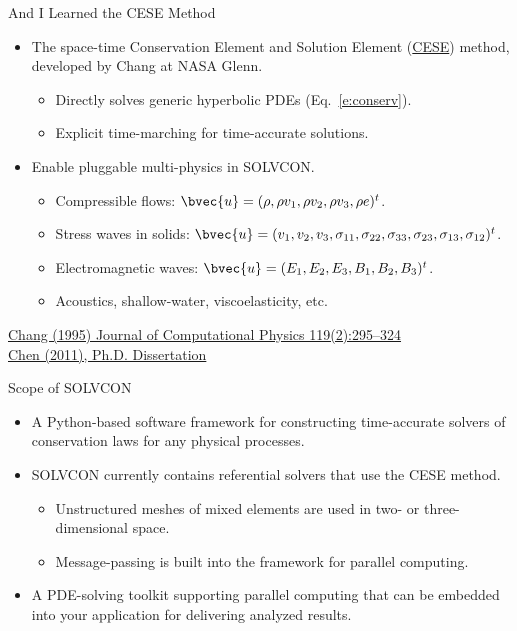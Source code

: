 \documentclass[dvips,xcolor=pst,14pt]{beamer}
\begin{document}
\begin{frame}{
%
And I Learned the CESE Method
%
}
\begin{itemize}
  \item The space-time Conservation Element and Solution Element
  (\href{http://www.grc.nasa.gov/WWW/microbus/}{CESE}) method, developed by
  Chang at NASA Glenn.
  \begin{itemize}
    \item Directly solves generic hyperbolic PDEs (Eq.~\eqref{e:conserv}).
    \item Explicit time-marching for time-accurate solutions.
  \end{itemize}
  \item Enable pluggable multi-physics in SOLVCON.
  \begin{itemize}
    \item Compressible flows: $\bvec{u} = (\rho, \rho v_1, \rho v_2, \rho v_3,
    \rho e)^t$.
    \item Stress waves in solids: $\bvec{u} = (v_1, v_2, v_3, \sigma_{11},
    \sigma_{22}, \sigma_{33}, \sigma_{23}, \sigma_{13}, \sigma_{12})^t$.
    \item Electromagnetic waves: $\bvec{u} = (E_1, E_2, E_3, B_1, B_2, B_3)^t$.
    \item Acoustics, shallow-water, viscoelasticity, etc.
  \end{itemize}
\end{itemize}

\begin{flushright}\footnotesize
\href{http://dx.doi.org/10.1006/jcph.1995.1137}{Chang (1995) Journal of
Computational Physics 119(2):295--324} \\
\href{http://solvcon.net/yyc/publications.html}{Chen (2011), Ph.D. Dissertation}
\end{flushright}

\end{frame}

\begin{frame}{
%
Scope of SOLVCON
%
}
\begin{itemize}
  \item A Python-based software framework for constructing time-accurate
  solvers of conservation laws for any physical processes.
  \item SOLVCON currently contains referential solvers that use the CESE method.
  \begin{itemize}
    \item Unstructured meshes of mixed elements are used in two- or
    three-dimensional space.
    \item Message-passing is built into the framework for parallel computing.
  \end{itemize}
  \item A PDE-solving toolkit supporting parallel computing that can be
  embedded into your application for delivering analyzed results.
\end{itemize}
\end{frame}
\end{document}
